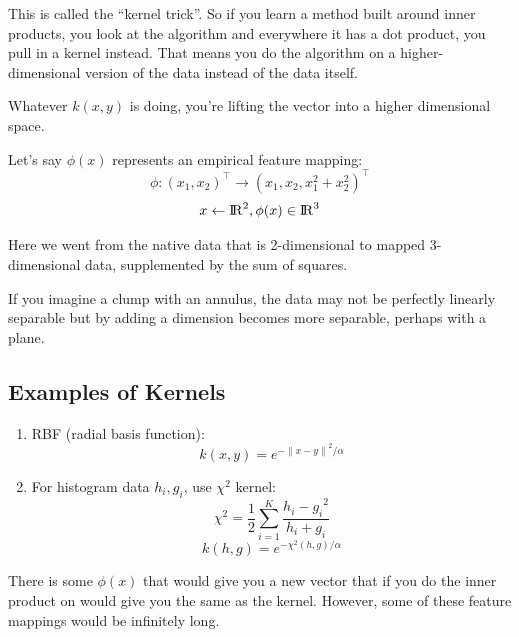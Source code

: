 \documentclass[a4paper]{article}
\begin{document}
This is called the ``kernel trick''.  So if you learn a method built around inner products, you look at the algorithm and everywhere it has a dot product, you pull in a kernel instead.  That means you do the algorithm on a higher-dimensional version of the data instead of the data itself.

Whatever $k(x,y)$ is doing, you're lifting the vector into a higher dimensional space.

Let's say $\phi(x)$ represents an empirical feature mapping:
$$
\phi: (x_1, x_2)^\top \rightarrow (x_1, x_2, x_1^2+x_2^2)^\top
$$
$$
x \leftarrow {\rm I\!R}^2, \phi(x) \in {\rm I\!R}^3
$$

Here we went from the native data that is 2-dimensional to mapped 3-dimensional data, supplemented by the sum of squares.

If you imagine a clump with an annulus, the data may not be perfectly linearly separable but by adding a dimension becomes more separable, perhaps with a plane.

\subsection{Examples of Kernels}

\begin{enumerate}
\item
RBF (radial basis function):
$$
k(x,y) = e^{-{\| x-y \|}^2 / \alpha}
$$

\item For histogram data $h_i, g_i$, use $\chi^2$ kernel:
$$
\chi^2 = \frac{1}{2} \sum_{i=1}^{K} \frac{{h_i-g_i}^2}{h_i+g_i}
$$
$$
k(h,g) = e^{-\chi^2(h,g) / \alpha}
$$
\end{enumerate}


There is some $\phi(x)$ that would give you a new vector that if you do the inner product on would give you the same as the kernel.  However, some of these feature mappings would be infinitely long.  
\end{document}
